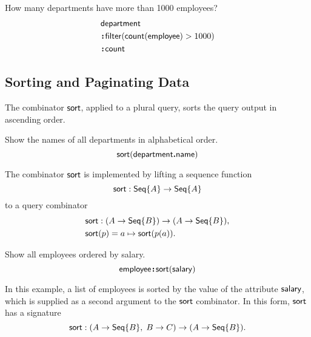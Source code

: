 \begin{demo}
    \label{ex:filter-by-size-and-count}
    How many departments have more than 1000 employees?
    \begin{align*}
        & \mathsf{department} \\
        & \!\boldsymbol{:}\!\mathsf{filter}(\mathsf{count}(\mathsf{employee})>1000) \\
        & \!\boldsymbol{:}\!\mathsf{count}
    \end{align*}
\end{demo}

\subsection*{Sorting and Paginating Data}

The combinator $\mathsf{sort}$, applied to a plural query, sorts the query output in
ascending order.

\begin{demo}
    \label{ex:sort-department-name}
    Show the names of all departments in alphabetical order.
    \begin{equation*}
        \mathsf{sort}(\mathsf{department}\boldsymbol{.}\mathsf{name})
    \end{equation*}
\end{demo}

The combinator $\mathsf{sort}$ is implemented by lifting a sequence function
\begin{equation*}
    \mathsf{sort} : \mathsf{Seq}{\left\{A\right\}} \to \mathsf{Seq}{\left\{A\right\}}
\end{equation*}
to a query combinator
\begin{align*}
    & \mathsf{sort} : (A \to \mathsf{Seq}{\left\{B\right\}}) \to (A \to \mathsf{Seq}{\left\{B\right\}}), \\
    & \mathsf{sort}(p) = a \mapsto \mathsf{sort}(p(a)).
\end{align*}

\begin{demo}
    \label{ex:sort-employee-by-salary}
    Show all employees ordered by salary.
    \begin{equation*}
        \mathsf{employee}\!\boldsymbol{:}\!\mathsf{sort}(\mathsf{salary})
    \end{equation*}
\end{demo}

In this example, a list of employees is sorted by the value of the attribute
$\mathsf{salary}$, which is supplied as a second argument to the $\mathsf{sort}$ combinator.
In this form, $\mathsf{sort}$ has a signature
\begin{equation*}
    \mathsf{sort} : (A \to \mathsf{Seq}{\left\{B\right\}},\; B \to C) \to (A \to \mathsf{Seq}{\left\{B\right\}}).
\end{equation*}

